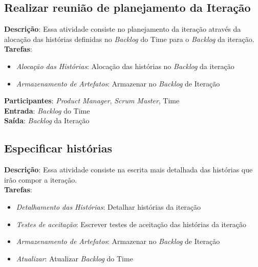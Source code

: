 \subsection{Realizar reunião de planejamento da Iteração}
  \textbf{Descrição}: Essa atividade consiste no planejamento da iteração através da alocação das histórias definidas no \textit{Backlog} do Time para o \textit{Backlog} da iteração. \\

  \textbf{Tarefas}:
  \begin{itemize}
   \item \indent \textit{Alocação das Histórias}: Alocação das histórias no \textit{Backlog} da iteração

   \item \indent \textit{Armazenamento de Artefatos}: Armazenar no \textit{Backlog} de Iteração
  \end{itemize}

  \textbf{Participantes}: \textit{Product Manager}, \textit{Scrum Master}, Time\\

  \textbf{Entrada}: \textit{Backlog} do Time \\

  \textbf{Saída}:  \textit{Backlog} da Iteração\\

\subsection{Especificar histórias}
  \textbf{Descrição}: Essa atividade consiste na escrita mais detalhada das histórias que irão compor a
iteração. \\

  \textbf{Tarefas}:
  \begin{itemize}
   \item \indent \textit{Detalhamento das Histórias}: Detalhar histórias da iteração
   
   \item \indent \textit{Testes de aceitação}: Escrever testes de aceitação das histórias da iteração

   \item \indent \textit{Armazenamento de Artefatos}: Armazenar no \textit{Backlog} de Iteração

   \item \indent \textit{Atualizar}: Atualizar \textit{Backlog} do Time
  \end{itemize}

